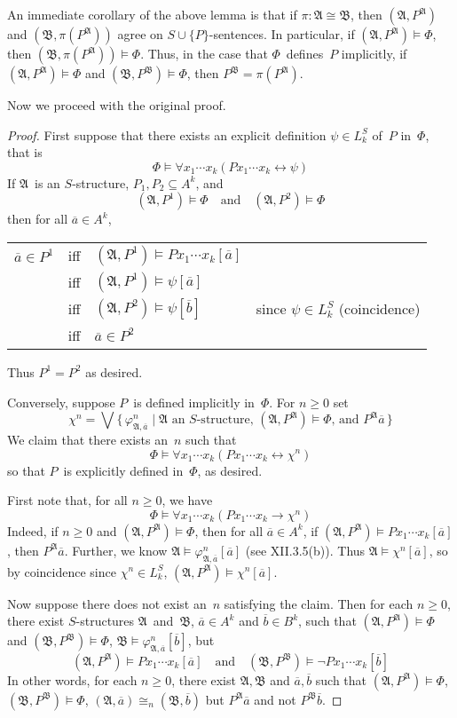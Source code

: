 \documentclass[letterpaper]{article}
\newcommand{\limp}{\rightarrow}
\newcommand{\liff}{\leftrightarrow}
\newcommand{\iso}{\cong}
\newcommand{\union}{\cup}
\newcommand{\A}{\mathfrak{A}}
\newcommand{\B}{\mathfrak{B}}
\newcommand{\biglor}{\textstyle{\bigvee}}
\theoremstyle{remark}
\begin{document}
\noindent An immediate corollary of the above lemma is that if $\pi:\A\iso\B$, then $(\A,P^{\A})$ and $(\B,\pi(P^{\A}))$ agree on $S\union\{P\}$-sentences. In particular, if $(\A,P^{\A})\models\Phi$, then $(\B,\pi(P^{\A}))\models\Phi$. Thus, in the case that $\Phi$~defines~$P$ implicitly, if $(\A,P^{\A})\models\Phi$ and $(\B,P^{\B})\models\Phi$, then $P^{\B}=\pi(P^{\A})$.

Now we proceed with the original proof.
\begin{proof}
First suppose that there exists an explicit definition $\psi\in L_k^S$ of~$P$ in~$\Phi$, that is
$$\Phi\models\forall x_1\cdots x_k(Px_1\cdots x_k\liff\psi)$$
If $\A$~is an $S$-structure, $P_1,P_2\subseteq A^k$, and
$$(\A,P^1)\models\Phi\quad\text{and}\quad(\A,P^2)\models\Phi$$
then for all $\overline{a}\in A^k$,
\begin{center}
\begin{tabular}{rcll}
$\overline{a}\in P^1$&iff&$(\A,P^1)\models Px_1\cdots x_k[\overline{a}]$&\\
	&iff&$(\A,P^1)\models\psi[\overline{a}]$&\\
	&iff&$(\A,P^2)\models\psi[\overline{b}]$&since $\psi\in L_k^S$ (coincidence)\\
	&iff&$\overline{a}\in P^2$&
\end{tabular}
\end{center}
Thus $P^1=P^2$ as desired.

Conversely, suppose $P$~is defined implicitly in~$\Phi$. For $n\ge0$ set
$$\chi^n=\biglor\{\,\varphi_{\A,\overline{a}}^n\mid\text{$\A $~an $S$-structure, $(\A,P^{\A})\models\Phi $, and $P^{\A}\overline{a} $}\,\}$$
We claim that there exists an~$n$ such that
$$\Phi\models\forall x_1\cdots x_k(Px_1\cdots x_k\liff\chi^n)$$
so that $P$~is explicitly defined in~$\Phi$, as desired.

First note that, for all $n\ge0$, we have
$$\Phi\models\forall x_1\cdots x_k(Px_1\cdots x_k\limp\chi^n)$$
Indeed, if $n\ge0$ and $(\A,P^{\A})\models\Phi$, then for all $\overline{a}\in A^k$, if $(\A,P^{\A})\models Px_1\cdots x_k[\overline{a}]$, then $P^{\A}\overline{a}$. Further, we know $\A\models\varphi_{\A,\overline{a}}^n[\overline{a}]$ (see XII.3.5(b)). Thus $\A\models\chi^n[\overline{a}]$, so by coincidence since $\chi^n\in L_k^S$, $(\A,P^{\A})\models\chi^n[\overline{a}]$.

Now suppose there does not exist an~$n$ satisfying the claim. Then for each $n\ge0$, there exist $S$-structures $\A$~and~$\B$, $\overline{a}\in A^k$ and $\overline{b}\in B^k$, such that $(\A,P^{\A})\models\Phi$ and $(\B,P^{\B})\models\Phi$, $\B\models\varphi^n_{\A,\overline{a}}[\overline{b}]$, but
$$(\A,P^{\A})\models Px_1\cdots x_k[\overline{a}]\quad\text{and}\quad(\B,P^{\B})\models\lnot Px_1\cdots x_k[\overline{b}]$$
In other words, for each $n\ge0$, there exist $\A,\B$ and $\overline{a},\overline{b}$ such that $(\A,P^{\A})\models\Phi$, $(\B,P^{\B})\models\Phi$, $(\A,\overline{a})\iso_n(\B,\overline{b})$ but $P^{\A}\overline{a}$ and not $P^{\B}\overline{b}$.


\end{proof}
\end{document}
